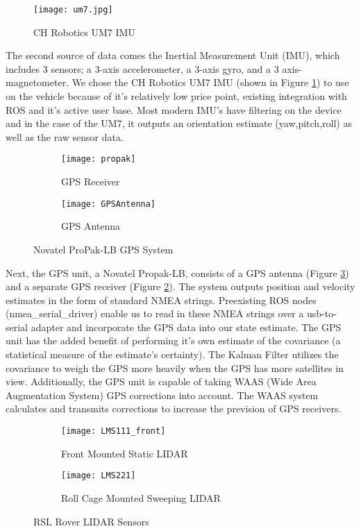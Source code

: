\begin{figure}[H]
	\centerline{\texttt{[image: um7.jpg]}}
	\caption[]{CH Robotics UM7 IMU}
	\label{fig:imu}
\end{figure}

The second source of data comes the Inertial Measurement Unit (IMU), which includes 3 sensors; a 3-axis accelerometer, a 3-axis gyro, and a 3 axis-magnetometer. We chose the CH Robotics UM7 IMU (shown in Figure \ref{fig:imu}) to use on the vehicle because of it's relatively low price point, existing integration with ROS and it's active user base. Most modern IMU's have filtering on the device and in the case of the UM7, it outputs an orientation estimate (yaw,pitch,roll) as well as the raw sensor data. 

\begin{figure}[H]
\centering
\begin{subfigure}{.5\textwidth}
	\centering
	\texttt{[image: propak]}
	\caption{GPS Receiver}
	\label{fig:gpsrec}
\end{subfigure}%
\begin{subfigure}{.5\textwidth}
	\centering
	\texttt{[image: GPSAntenna]}
	\caption{GPS Antenna}
	\label{fig:gpsant}
\end{subfigure}
\caption{Novatel ProPak-LB GPS System}
\label{fig:gps}
\end{figure}

Next, the GPS unit, a Novatel Propak-LB, consists of a GPS antenna (Figure \ref{fig:gpsant}) and a separate GPS receiver (Figure \ref{fig:gpsrec}). The system outputs position and velocity estimates in the form of standard NMEA strings. Preexisting ROS nodes (nmea\_serial\_driver) enable us to read in these NMEA strings over a usb-to-serial adapter and incorporate the GPS data into our state estimate. The GPS unit has the added benefit of performing it's own estimate of the covariance (a statistical measure of the estimate's certainty). The Kalman Filter utilizes the covariance to weigh the GPS more heavily when the GPS has more satellites in view. Additionally, the GPS unit is capable of taking WAAS (Wide Area Augmentation System) GPS corrections into account. The WAAS system calculates and transmits corrections to increase the prevision of GPS receivers.

\begin{figure}[H]
	\centering
	\begin{subfigure}{.5\textwidth}
		\centering
		\texttt{[image: LMS111\_front]}
		\caption{Front Mounted Static LIDAR}
		\label{fig:lidar_front}
	\end{subfigure}%
	\begin{subfigure}{.5\textwidth}
		\centering
		\texttt{[image: LMS221]}
		\caption{Roll Cage Mounted Sweeping LIDAR}
		\label{fig:lidar_scanning}
	\end{subfigure}
	\caption{RSL Rover LIDAR Sensors}
	\label{fig:lidar}
\end{figure}

